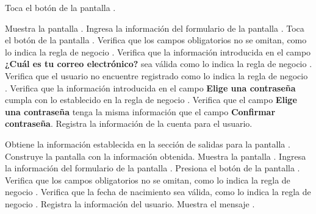  \begin{UCtrayectoria}
    \UCpaso[\UCactor] Toca el botón  de la pantalla .
    
    \UCpaso[\UCsist]  Muestra la pantalla .
    \UCpaso[\UCactor] Ingresa la información del formulario de la pantalla . \label{cua12:tb} 
    \UCpaso[\UCactor] Toca el botón  de la pantalla . 
    \UCpaso[\UCsist] Verifica que los campos obligatorios no se omitan, como lo indica la regla de negocio . 
    \UCpaso[\UCsist] Verifica que la información introducida en el campo \textbf{¿Cuál es tu correo electrónico?} sea válida como lo indica la regla de negocio . 
    \UCpaso[\UCsist] Verifica que el usuario no encuentre registrado como lo indica la regla de negocio . 
    \UCpaso[\UCsist] Verifica que la información introducida en el campo \textbf{Elige una contraseña} cumpla con lo establecido en la regla de negocio . 
    \UCpaso[\UCsist] Verifica que el campo \textbf{Elige una contraseña} tenga la misma información que el campo \textbf{Confirmar contraseña}.
    \UCpaso[\UCsist] Registra la información de la cuenta para el usuario.
    
    
    \UCpaso[\UCsist]  Obtiene la información establecida en la sección de salidas para la pantalla .
    \UCpaso[\UCsist]  Construye la pantalla  con la información obtenida.
    \UCpaso[\UCsist]  Muestra la pantalla .
    \UCpaso[\UCactor] Ingresa la información del formulario de la pantalla .
    \UCpaso[\UCactor] Presiona el botón  de la pantalla .
    \UCpaso[\UCsist] Verifica que los campos obligatorios no se omitan, como lo indica la regla de negocio . 
    \UCpaso[\UCsist] Verifica que la fecha de nacimiento sea válida, como lo indica la regla de negocio .
    \UCpaso[\UCsist] Registra la información del usuario.
    \UCpaso[\UCsist] Muestra el mensaje . 
 \end{UCtrayectoria}



